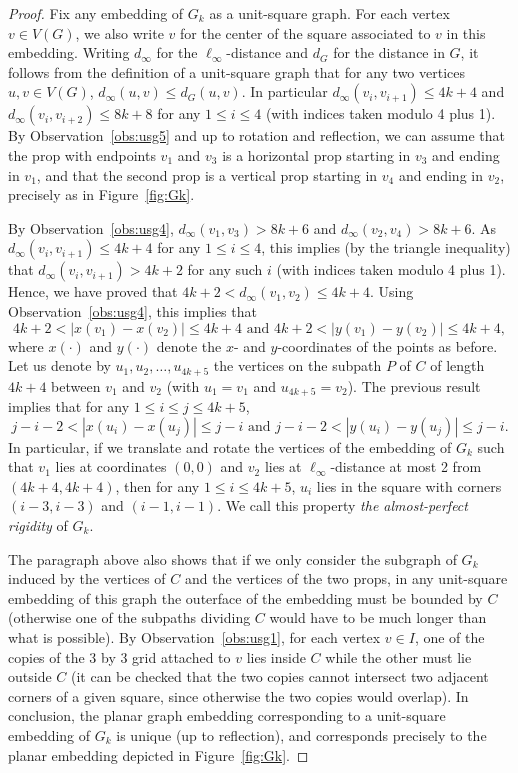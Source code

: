 \documentclass[a4paper,reqno, 12pt]{amsart}
\begin{document}
\begin{proof}
Fix any embedding of $G_k$ as a unit-square
graph. For each vertex $v\in V(G)$, we also write $v$ for the center of
the square associated to $v$ in this embedding. Writing $d_\infty$ for
the $\ell_\infty$-distance and $d_G$ for the distance in $G$, it
follows from the definition of a unit-square graph that for any two
vertices $u,v\in V(G)$, $d_\infty(u,v)\le d_G(u,v)$. In particular
$d_\infty(v_i,v_{i+1})\le 4k+4$ and $d_\infty(v_i,v_{i+2})  \le 8k+8$ for any $1\le i \le 4$ (with indices
taken modulo 4 plus 1). By Observation~\ref{obs:usg5} and up to rotation and
reflection, we can assume that the prop with
endpoints $v_1$ and $v_3$ is a horizontal prop starting in $v_3$ and
ending in $v_1$, and that the second prop is a vertical prop
starting in $v_4$ and ending in $v_2$, precisely as in Figure~\ref{fig:Gk}.

 By Observation~\ref{obs:usg4}, $d_\infty(v_1,v_{3})  > 8k+6$ and
 $d_\infty(v_2,v_4)  > 8k+6$.
 As $d_\infty(v_i,v_{i+1})\le 4k+4$ for any $1\le i \le 4$, this
 implies (by the triangle inequality) that $d_\infty(v_i,v_{i+1})>
 4k+2$ for any such $i$ (with indices
taken modulo 4 plus 1). Hence, we have proved that $4k+2<
d_\infty(v_1,v_2)\le 4k+4$. Using Observation~\ref{obs:usg4}, this
implies that \[4k+2 <|x(v_1)-x(v_2)|\le 4k+4 \text{ and } 4k+2
<|y(v_1)-y(v_2)|\le 4k+4,\] where $x(\cdot)$ and $y(\cdot)$ denote the
$x$- and $y$-coordinates of the points as before.
    Let us denote by $u_1, u_2, \ldots,
u_{4k+5}$ the vertices on the subpath $P$ of $C$ of length $4k+4$
between $v_1$ and $v_2$ (with $u_1=v_1$ and $u_{4k+5}=v_2$). The
previous result implies that for any $1\le i \le j \le 4k+5$,
\[j-i-2<
|x(u_i)-x(u_j)|\le j-i \text{ and } j-i-2<
|y(u_i)-y(u_j)|\le j-i.\] In particular, if we translate and rotate
the vertices of the embedding of $G_k$ such that $v_1$ lies at coordinates $(0,0)$ and $v_2$
lies at $\ell_\infty$-distance at most 2 from $(4k+4,4k+4)$, then for
any $1\le i  \le 4k+5$, $u_i$ lies in the square with corners
$(i-3,i-3)$ and $(i-1,i-1)$. We call this property \emph{the
  almost-perfect rigidity} of $G_k$.

The paragraph above also shows that if we only consider the subgraph
of $G_k$ induced by the vertices
of $C$ and the vertices of the two props, in any unit-square
embedding of this graph the outerface of the embedding must be bounded
by $C$ (otherwise one of the subpaths dividing $C$ would have to be
much longer than what is possible). By Observation~\ref{obs:usg1}, for
each vertex $v\in I$, one of the copies of the 3 by 3 grid attached to
$v$ lies inside
$C$ while the other must lie outside $C$ (it can be checked that the
two copies cannot intersect two adjacent corners of a given square,
since otherwise the two copies would overlap).
In conclusion, the planar graph embedding corresponding to a
unit-square embedding of $G_k$ is unique (up to  reflection), and
corresponds precisely to the planar embedding depicted in  Figure~\ref{fig:Gk}.


\end{proof}
\end{document}
